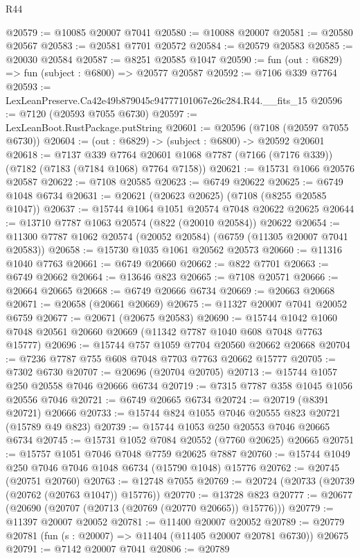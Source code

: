 \begin{lexlean}{R44}
\begin{coremodule}
{@20579 := @10085 @20007 @7041
@20580 := @10088 @20007
@20581 := @20580 @20567
@20583 := @20581 @7701 @20572
@20584 := @20579 @20583
@20585 := @20030 @20584
@20587 := @8251 @20585 @1047
@20590 := fun (out : @6829) => fun (subject : @6800) => @20577 @20587
@20592 := @7106 @339 @7764
@20593 := LexLeanPreserve.Ca42e49b879045c94777101067e26c284.R44.__fits_15
@20596 := @7120 (@20593 @7055 @6730)
@20597 := LexLeanBoot.RustPackage.putString
@20601 := @20596 (@7108 (@20597 @7055 @6730))
@20604 := (out : @6829) -> (subject : @6800) -> @20592 @20601
@20618 := @7137
    @339
    @7764
    @20601
    @1068
    @7787
    (@7166 (@7176 @339))
    (@7182 (@7183 (@7184 @1068) @7764 @7158))
@20621 := @15731 @1066 @20576 @20587
@20622 := @7108 @20585
@20623 := @6749 @20622
@20625 := @6749 @1048 @6734
@20631 := @20621 (@20623 @20625) (@7108 (@8255 @20585 @1047))
@20637 := @15744 @1064 @1051 @20574 @7048 @20622 @20625
@20644 := @13710 @7787 @1063 @20574 (@822 (@20010 @20584)) @20622
@20654 := @11300 @7787 @1062 @20574 (@20052 @20584) (@6759 (@11305 @20007 @7041 @20583))
@20658 := @15730 @1035 @1061 @20562 @20573
@20660 := @11316 @1040 @7763
@20661 := @6749 @20660
@20662 := @822 @7701
@20663 := @6749 @20662
@20664 := @13646 @823
@20665 := @7108 @20571
@20666 := @20664 @20665
@20668 := @6749 @20666 @6734
@20669 := @20663 @20668
@20671 := @20658 (@20661 @20669)
@20675 := @11327 @20007 @7041 @20052 @6759
@20677 := @20671 (@20675 @20583)
@20690 := @15744 @1042 @1060 @7048 @20561 @20660 @20669 (@11342 @7787 @1040 @608 @7048 @7763 @15777)
@20696 := @15744 @757 @1059 @7704 @20560 @20662 @20668
@20704 := @7236 @7787 @755 @608 @7048 @7703 @7763 @20662 @15777
@20705 := @7302 @6730
@20707 := @20696 (@20704 @20705)
@20713 := @15744 @1057 @250 @20558 @7046 @20666 @6734
@20719 := @7315 @7787 @358 @1045 @1056 @20556 @7046
@20721 := @6749 @20665 @6734
@20724 := @20719 (@8391 @20721) @20666
@20733 := @15744 @824 @1055 @7046 @20555 @823 @20721 (@15789 @49 @823)
@20739 := @15744 @1053 @250 @20553 @7046 @20665 @6734
@20745 := @15731 @1052 @7084 @20552 (@7760 @20625) @20665
@20751 := @15757 @1051 @7046 @7048 @7759 @20625 @7887
@20760 := @15744 @1049 @250 @7046 @7046 @1048 @6734 (@15790 @1048) @15776
@20762 := @20745 (@20751 @20760)
@20763 := @12748 @7055
@20769 := @20724 (@20733 (@20739 (@20762 (@20763 @1047)) @15776))
@20770 := @13728 @823
@20777 := @20677 (@20690 (@20707 (@20713 (@20769 (@20770 @20665)) @15776)))
@20779 := @11397 @20007 @20052
@20781 := @11400 @20007 @20052
@20789 := @20779 @20781 (fun (s : @20007) => @11404 (@11405 @20007 @20781 @6730)) @20675
@20791 := @7142 @20007 @7041
@20806 := @20789
}
\end{coremodule}
\end{lexlean}
